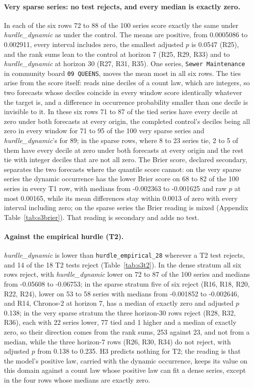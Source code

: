 \paragraph{Very sparse series: no test rejects, and every median is exactly zero.} In each of the six
rows 72 to 88 of the 100 series score exactly the same under \emph{hurdle\_dynamic} as under the control.
The means are positive, from 0.0005086 to 0.002911, every interval includes zero, the smallest adjusted $p$
is 0.0547 (R25), and the rank sums lean to the control at horizon 7 (R25, R29, R33) and to
\emph{hurdle\_dynamic} at horizon 30 (R27, R31, R35). One series, \texttt{Sewer Maintenance} in community
board \texttt{09 QUEENS}, moves the mean most in all six rows. The ties arise from the score itself: \qs{}
reads nine deciles of a count law, which are integers, so two forecasts whose deciles coincide in every
window score identically whatever the target is, and a difference in occurrence probability smaller than one
decile is invisible to it. In these six rows 71 to 87 of the tied series have every decile at zero under both
forecasts at every origin, the completed control's deciles being all zero in every window for 71 to 95 of
the 100 very sparse series and \emph{hurdle\_dynamic}'s for 89; in the sparse rows, where 8 to 23 series
tie, 2 to 5 of them have every decile at zero under both forecasts at every origin and the rest tie with
integer deciles that are not all zero. The Brier score, declared secondary,
separates the two forecasts where the quantile score cannot: on the very sparse series the dynamic occurrence
has the lower Brier score on 68 to 82 of the 100 series in every T1 row, with medians from -0.002363 to
-0.001625 and raw $p$ at most 0.00165, while its mean differences stay within 0.0013 of zero with every
interval including zero; on the sparse series the Brier reading is mixed (Appendix Table~\ref{tab:s3brier}).
That reading is secondary and adds no test.

\paragraph{Against the empirical hurdle (T2).} \emph{hurdle\_dynamic} is lower than
\texttt{hurdle\_empirical\_28} wherever a T2 test rejects, and 14 of the 18 T2 tests reject
(Table~\ref{tab:s3t2}). In the dense stratum all six rows reject, with \emph{hurdle\_dynamic} lower on 72 to
87 of the 100 series and medians from -0.05608 to -0.06753; in the sparse stratum five of six reject (R16,
R18, R20, R22, R24), lower on 53 to 58 series with medians from -0.001852 to -0.002646, and R14, Chronos-2
at horizon 7, has a median of exactly zero and adjusted $p$ 0.138; in the very sparse stratum the three
horizon-30 rows reject (R28, R32, R36), each with 22 series lower, 77 tied and 1 higher and a median of
exactly zero, so their direction comes from the rank sums, 253 against 23, and not from a median, while the
three horizon-7 rows (R26, R30, R34) do not reject, with adjusted $p$ from 0.138 to 0.235. H3 predicts
nothing for T2; the reading is that the model's positive law, carried with the dynamic occurrence, keeps its
value on this domain against a count law whose positive law can fit a dense series, except in the four rows
whose medians are exactly zero.

